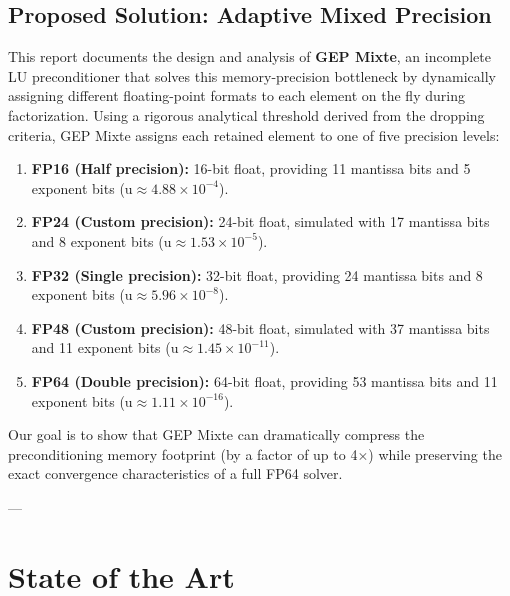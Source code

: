 \documentclass[11pt,a4paper]{article}
\begin{document}
\subsection{Proposed Solution: Adaptive Mixed Precision}
This report documents the design and analysis of \textbf{GEP Mixte}, an incomplete LU preconditioner that solves this memory-precision bottleneck by dynamically assigning different floating-point formats to each element on the fly during factorization. Using a rigorous analytical threshold derived from the dropping criteria, GEP Mixte assigns each retained element to one of five precision levels:
\begin{enumerate}
    \item \textbf{FP16 (Half precision):} 16-bit float, providing 11 mantissa bits and 5 exponent bits ($\text{u} \approx 4.88 \times 10^{-4}$).
    \item \textbf{FP24 (Custom precision):} 24-bit float, simulated with 17 mantissa bits and 8 exponent bits ($\text{u} \approx 1.53 \times 10^{-5}$).
    \item \textbf{FP32 (Single precision):} 32-bit float, providing 24 mantissa bits and 8 exponent bits ($\text{u} \approx 5.96 \times 10^{-8}$).
    \item \textbf{FP48 (Custom precision):} 48-bit float, simulated with 37 mantissa bits and 11 exponent bits ($\text{u} \approx 1.45 \times 10^{-11}$).
    \item \textbf{FP64 (Double precision):} 64-bit float, providing 53 mantissa bits and 11 exponent bits ($\text{u} \approx 1.11 \times 10^{-16}$).
\end{enumerate}

Our goal is to show that GEP Mixte can dramatically compress the preconditioning memory footprint (by a factor of up to 4$\times$) while preserving the exact convergence characteristics of a full FP64 solver.

---

\section{State of the Art}
\end{document}
